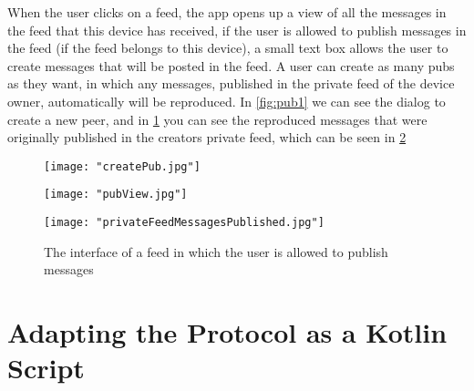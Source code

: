 When the user clicks on a feed, the app opens up a view of all the messages in the feed that this device has received, if the user is allowed to publish messages in the feed (if the feed belongs to this device), a small text box allows the user to create messages that will be posted in the feed. A user can create as many pubs as they want, in which any messages, published in the private feed of the device owner, automatically will be reproduced. In \ref{fig:pub1} we can see the dialog to create a new peer, and in \ref{fig:pub2} you can see the reproduced messages that were originally published in the creators private feed, which can be seen in \ref{fig:FeedView}
\begin{figure}
	\centering
	\begin{minipage}{.5\textwidth}
		\centering
		\texttt{[image: "createPub.jpg"]}
		\label{fig:pub1}
	\end{minipage}%
	\begin{minipage}{.5\textwidth}
		\centering
		\texttt{[image: "pubView.jpg"]}
		\label{fig:pub2}
	\end{minipage}
\end{figure}

\begin{figure}[!t]
	\centering
	\texttt{[image: "privateFeedMessagesPublished.jpg"]}
	\caption{The interface of a feed in which the user is allowed to publish messages}
	\label{fig:FeedView}
\end{figure}

\section{Adapting the Protocol as a Kotlin Script}




